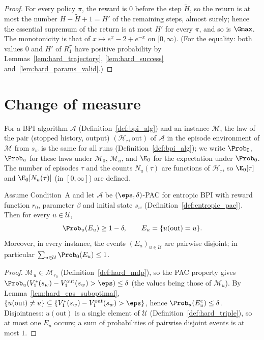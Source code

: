 \begin{proof}
\leanok
{}
For every policy $\pi$, the reward is $0$ before the step $\tilde H$, so the return is at most the
number $H - \tilde H + 1 = H'$ of the remaining steps, almost surely; hence the essential supremum of the
return is at most $H'$ for every $\pi$, and so is $\Gmax$. The monotonicity is that of
$x \mapsto e^x - 2 + e^{-x}$ on $[0, \infty)$. (For the equality: both values $0$ and $H'$ of
$R^\pi_1$ have positive probability by Lemmas~\ref{lem:hard_trajectory}, \ref{lem:hard_success}
and~\ref{lem:hard_params_valid}.)
\end{proof}

\section{Change of measure}
\label{sec:lb_change_of_measure}

For a BPI algorithm $\mathcal A$ (Definition~\ref{def:bpi_alg}) and an instance $\mathcal M$, the
law of the pair (stopped history, output) $(\mathcal H_\tau, \mathrm{out})$ of $\mathcal A$ in the
episode environment of $\mathcal M$ from $s_w$ is the same for all runs (Definition~\ref{def:bpi_alg});
we write $\Prob_0$, $\Prob_u$ for these laws under $\mathcal M_0$, $\mathcal M_u$, and $\E_0$ for
the expectation under $\Prob_0$. The number of episodes $\tau$ and the counts $N_u(\tau)$ are
functions of $\mathcal H_\tau$, so $\E_0[\tau]$ and $\E_0[N_u(\tau)]$ (in $[0, \infty]$) are defined.

\begin{lemma}\label{lem:hard_pac_event}
\leanok
Assume Condition~A and let $\mathcal A$ be $(\eps,\delta)$-PAC for entropic BPI with reward
function $r_0$, parameter $\beta$ and initial state $s_w$ (Definition~\ref{def:entropic_pac}).
Then for every $u \in \mathcal U$,
\[
  \Prob_u(E_u) \ge 1 - \delta, \qquad E_u = \{u(\mathrm{out}) = u\} .
\]
Moreover, in every instance, the events $(E_u)_{u \in \mathcal U}$ are pairwise disjoint; in
particular $\sum_{u \in \mathcal U}\Prob_0(E_u) \le 1$.
\end{lemma}

\begin{proof}
\leanok
{}
$\mathcal M_u \in \mathcal M_{r_0}$ (Definition~\ref{def:hard_mdp}), so the PAC property gives
$\Prob_u(V^*_1(s_w) - V^{\mathrm{out}}_1(s_w) > \eps) \le \delta$ (the values being those of
$\mathcal M_u$). By Lemma~\ref{lem:hard_eps_suboptimal},
$\{u(\mathrm{out}) \ne u\} \subseteq \{V^*_1(s_w) - V^{\mathrm{out}}_1(s_w) > \eps\}$, hence
$\Prob_u(E_u^c) \le \delta$. Disjointness: $u(\mathrm{out})$ is a single element of $\mathcal U$
(Definition~\ref{def:hard_triple}), so at most one $E_u$ occurs; a sum of probabilities of
pairwise disjoint events is at most $1$.
\end{proof}

